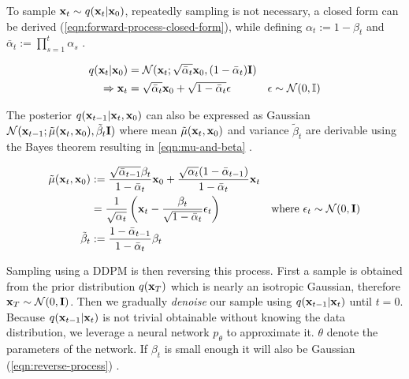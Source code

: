 To sample $\mathbf{x}_t \sim q(\mathbf{x}_t | \mathbf{x}_0)$, repeatedly sampling is not necessary, a closed form can be derived (\autoref{eqn:forward-process-closed-form}),
while defining $\alpha_t := 1 - \beta_t$ and $\bar\alpha_t := \prod_{s=1}^t \alpha_s$ \parencite{ddpm}.

\begin{equation}
   \label{eqn:forward-process-closed-form}
   \begin{aligned}
      q(\mathbf{x}_t|\mathbf{x}_0)     & = \mathcal{N}(\mathbf{x}_t; \sqrt{\bar{\alpha}_t}\mathbf{x}_{0}, (1 - \bar{\alpha}_t) \mathbf{I})                                            \\
      \Rightarrow \mathbf{x}_t & = \sqrt{\bar{\alpha}_t}\mathbf{x}_{0} + \sqrt{1 - \bar{\alpha}_t} \epsilon                & \epsilon \sim \mathcal{N}(0, \mathbb{I})
   \end{aligned}
\end{equation}

The posterior $q(\mathbf{x}_{t-1}|\mathbf{x}_t, \mathbf{x}_0)$ can also be expressed as Gaussian $\mathcal{N}(\mathbf{x}_{t-1}; \tilde{\mu}(\mathbf{x}_t, \mathbf{x}_0), \tilde{\beta}_t\mathbf{I})$ where mean $\tilde{\mu}(\mathbf{x}_t, \mathbf{x}_0)$ and variance $\tilde{\beta}_t$
are derivable using the Bayes theorem resulting in \autoref{eqn:mu-and-beta} \parencite{ddpm}.

\begin{equation}
   \label{eqn:mu-and-beta}
   \begin{aligned}
      \tilde{\mu}(\mathbf{x}_t, \mathbf{x}_0) & := \frac{\sqrt{\bar{\alpha}_{t-1}}\beta_t}{1 - \bar{\alpha}_{t}}\mathbf{x}_0 + \frac{\sqrt{\alpha_t}(1 - \bar{\alpha}_{t-1})}{1 - \bar{\alpha}_{t}}\mathbf{x}_t                                                            \\
                              & = \frac{1}{\sqrt{\alpha_t}} \left(\mathbf{x}_t - \frac{\beta_t}{\sqrt{1 - \bar{\alpha}_t}} \epsilon_t \right)                                           & \text{where } \epsilon_t \sim \mathcal{N}(0, \mathbf{I}) \\
      \tilde{\beta}_t         & := \frac{1 - \bar{\alpha}_{t-1}}{1 - \bar{\alpha}_t} \beta_t
   \end{aligned}
\end{equation}

Sampling using a DDPM is then reversing this process.
First a sample is obtained from the prior distribution $q(\mathbf{x}_T)$ which
is nearly an isotropic Gaussian, therefore $\mathbf{x}_T \sim \mathcal{N}(0, \mathbf{I})$.
Then we gradually \textit{denoise} our sample using $q(\mathbf{x}_{t-1}|\mathbf{x}_t)$ until $t = 0$.
Because $q(\mathbf{x}_{t-1}|\mathbf{x}_t)$ is not trivial obtainable without knowing the data distribution,
we leverage a neural network $p_\theta$ to approximate it.
$\theta$ denote the parameters of the network.
If $\beta_t$ is small enough it will also be Gaussian (\autoref{eqn:reverse-process}) \parencite{ddpm}.

